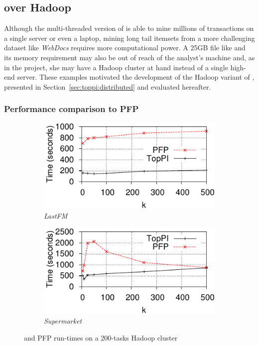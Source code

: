 \subsection{\toppi over Hadoop}
\label{sec:toppi:xp:hadoop}

Although the multi-threaded version of \toppi is able to mine millions of transactions
on a single server or even a laptop,
mining long tail itemsets from a more challenging dataset like \emph{WebDocs} requires more computational power.
A 25GB file like \prodassocreceipt and its memory requirement may also be out of reach of the analyst's machine
and, as in the \datalyse project, she may have a Hadoop cluster at hand instead of a single high-end server.
These examples motivated the development of the Hadoop variant of \toppi,
presented in Section~\ref{sec:toppi:distributed} and evaluated hereafter.

\subsubsection{Performance comparison to PFP}

\begin{figure}
	\centering
	\begin{subfigure}[b]{0.48\textwidth}
		\includegraphics{fig/toppi/variousK/runtime-lastfm.pdf}
		\caption{\em LastFM}
	\end{subfigure}
	\hfill
	\begin{subfigure}[b]{0.48\textwidth}
		\includegraphics{fig/toppi/variousK/runtime-supermarket.pdf}
		\caption{\em Supermarket}
	\end{subfigure}
	\caption{\label{fig:PFP:runtime}
		\toppi and PFP run-times on a 200-tasks Hadoop cluster
	}
\end{figure}


